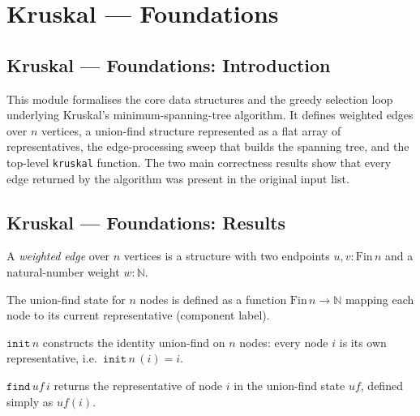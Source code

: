 \section{Kruskal --- Foundations}
\subsection*{Kruskal --- Foundations: Introduction}

This module formalises the core data structures and the greedy selection loop
underlying Kruskal's minimum-spanning-tree algorithm.  It defines weighted edges
over $n$ vertices, a union-find structure represented as a flat array of
representatives, the edge-processing sweep that builds the spanning tree, and the
top-level \texttt{kruskal} function.  The two main correctness results show that
every edge returned by the algorithm was present in the original input list.

\subsection*{Kruskal --- Foundations: Results}

\begin{definition}
\label{Kruskal.WEdge}
\leanok
A \emph{weighted edge} over $n$ vertices is a structure with two endpoints
$u, v : \mathrm{Fin}\,n$ and a natural-number weight $w : \mathbb{N}$.
\end{definition}

\begin{definition}
\label{Kruskal.UF}
\leanok
The union-find state for $n$ nodes is defined as a function
$\mathrm{Fin}\,n \to \mathbb{N}$ mapping each node to its current
representative (component label).
\end{definition}

\begin{definition}
\label{Kruskal.UF.init}
\leanok
{}
$\mathtt{init}\,n$ constructs the identity union-find on $n$ nodes: every node
$i$ is its own representative, i.e.\ $\mathtt{init}\,n\,(i) = i$.
\end{definition}

\begin{definition}
\label{Kruskal.UF.find}
\leanok
{}
$\mathtt{find}\,\mathit{uf}\,i$ returns the representative of node $i$ in
the union-find state $\mathit{uf}$, defined simply as $\mathit{uf}(i)$.
\end{definition}

